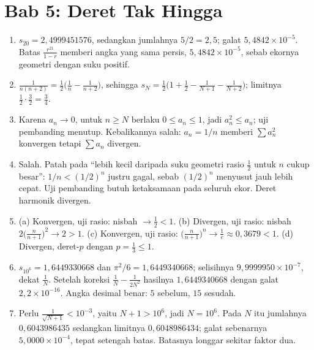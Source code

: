 \section*{Bab 5: Deret Tak Hingga}
\begin{enumerate}[label=\textbf{5.\arabic*}]
  \item $s_{20}=2{,}4999451576$, sedangkan jumlahnya $5/2=2{,}5$; galat
        $5{,}4842\times10^{-5}$. Batas $\frac{r^{21}}{1-r}$ memberi angka yang sama
        persis, $5{,}4842\times10^{-5}$, sebab ekornya geometri dengan suku positif.

  \item $\frac{1}{n(n+2)}=\frac12\bigl(\frac1n-\frac1{n+2}\bigr)$, sehingga
        $s_{N}=\frac12\bigl(1+\frac12-\frac{1}{N+1}-\frac{1}{N+2}\bigr)$; limitnya
        $\frac12\cdot\frac32=\frac34$.

  \item Karena $a_{n}\to0$, untuk $n\ge N$ berlaku $0\le a_{n}\le1$, jadi
        $a_{n}^{2}\le a_{n}$; uji pembanding menutup. Kebalikannya salah:
        $a_{n}=1/n$ memberi $\sum a_{n}^{2}$ konvergen tetapi $\sum a_{n}$ divergen.

  \item Salah. Patah pada ``lebih kecil daripada suku geometri rasio $\tfrac12$ untuk
        $n$ cukup besar'': $1/n<(1/2)^{n}$ justru gagal, sebab $(1/2)^{n}$ menyusut
        jauh lebih cepat. Uji pembanding butuh ketaksamaan pada seluruh ekor. Deret
        harmonik divergen.

  \item (a) Konvergen, uji rasio: nisbah $\to\tfrac12<1$. (b) Divergen, uji rasio:
        nisbah $2\bigl(\frac{n}{n+1}\bigr)^{2}\to2>1$. (c) Konvergen, uji rasio:
        $\bigl(\frac{n}{n+1}\bigr)^{n}\to\frac1e\approx0{,}3679<1$. (d) Divergen,
        deret-$p$ dengan $p=\tfrac13\le1$.

  \item $s_{10^{6}}=1{,}6449330668$ dan $\pi^{2}/6=1{,}6449340668$; selisihnya
        $9{,}9999950\times10^{-7}$, dekat $\frac1N$. Setelah koreksi
        $\frac1N-\frac{1}{2N^{2}}$ hasilnya $1{,}6449340668$ dengan galat
        $2{,}2\times10^{-16}$. Angka desimal benar: $5$ sebelum, $15$ sesudah.

  \item Perlu $\frac{1}{\sqrt{N+1}}<10^{-3}$, yaitu $N+1>10^{6}$, jadi $N=10^{6}$.
        Pada $N$ itu jumlahnya $0{,}6043986435$ sedangkan limitnya
        $0{,}6048986434$; galat sebenarnya $5{,}0000\times10^{-4}$, tepat setengah
        batas. Batasnya longgar sekitar faktor dua.


\end{enumerate}
